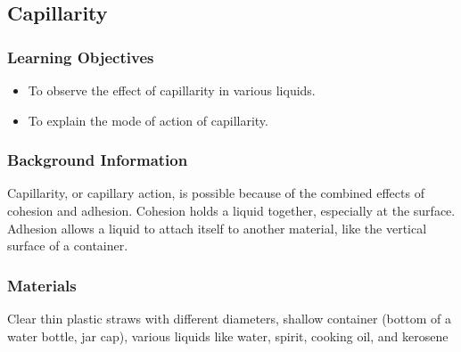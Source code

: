%
%




\subsection{Capillarity}

\subsubsection*{Learning Objectives}
\begin{itemize}
\item{To observe the effect of capillarity in various liquids.} 
\item{To explain the mode of action of capillarity.} 
\end{itemize}

\subsubsection*{Background Information}
Capillarity, or capillary action, is possible because of the combined effects of cohesion and adhesion. Cohesion holds a liquid together, especially at the surface. Adhesion allows a liquid to attach itself to another material, like the vertical surface of a container. 

\subsubsection*{Materials}
Clear thin plastic straws with different diameters, shallow container (bottom of a water bottle, jar cap), various liquids like water, spirit, cooking oil, and kerosene 

